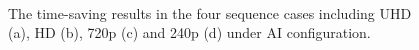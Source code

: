 \documentclass[lettersize,journal]{IEEEtran}
\begin{document}
\begin{figure}[htbp]
	\centering
	 \hspace{2pt}
	 \vspace{-5pt} \\
	 \hspace{2pt}
	\caption{The time-saving results in the four sequence cases including UHD (a), HD (b), 720p (c) and 240p (d) under AI configuration.}
	\label{Time curves}
\end{figure}
\end{document}
